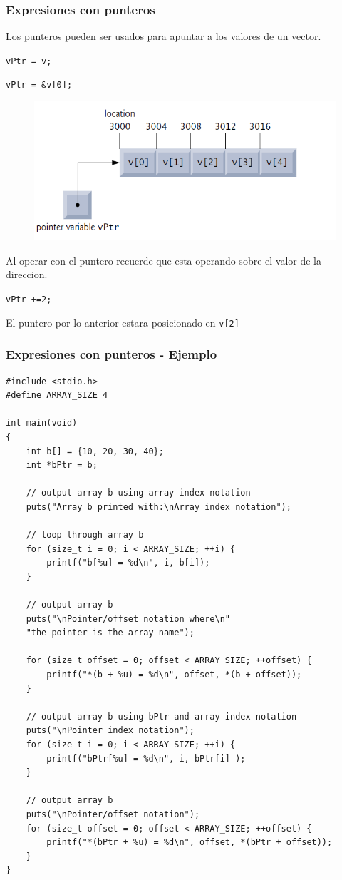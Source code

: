 \documentclass[10.5pt,scale=1.0,t,aspectratio=169,hyperref={pdfpagelabels=false}]{beamer}
\begin{document}
\begin{frame}
	\frametitle{Expresiones con punteros}
	Los punteros pueden ser usados para apuntar a los valores de un vector.
	
	\texttt{vPtr = v;}
	
	\texttt{vPtr = \&v[0];}
	
	\begin{figure}
		\centering
		\includegraphics[scale=0.5]{PunteroArreglo}
	\end{figure}

	Al operar con el puntero recuerde que esta operando sobre el valor de la direccion. 
	
	\texttt{vPtr +=2;}
	
	El puntero por lo anterior estara posicionado en \texttt{v[2]}	
\end{frame}

\begin{frame}[fragile]
	\frametitle{Expresiones con punteros - Ejemplo}
	\begin{multicols}{2}
	\begin{lstlisting}[style=CStyle]
#include <stdio.h>
#define ARRAY_SIZE 4

int main(void)
{
	int b[] = {10, 20, 30, 40}; 
	int *bPtr = b; 
	
	// output array b using array index notation
	puts("Array b printed with:\nArray index notation");
	
	// loop through array b
	for (size_t i = 0; i < ARRAY_SIZE; ++i) {
		printf("b[%u] = %d\n", i, b[i]);
	}
	
	// output array b 
	puts("\nPointer/offset notation where\n"
	"the pointer is the array name");
	
	for (size_t offset = 0; offset < ARRAY_SIZE; ++offset) {
		printf("*(b + %u) = %d\n", offset, *(b + offset));
	}
	
	// output array b using bPtr and array index notation
	puts("\nPointer index notation");
	for (size_t i = 0; i < ARRAY_SIZE; ++i) {
		printf("bPtr[%u] = %d\n", i, bPtr[i] );
	}
	
	// output array b 
	puts("\nPointer/offset notation");
	for (size_t offset = 0; offset < ARRAY_SIZE; ++offset) {
		printf("*(bPtr + %u) = %d\n", offset, *(bPtr + offset));
	}
}
\end{lstlisting}
	\end{multicols}

\end{frame}
\end{document}
